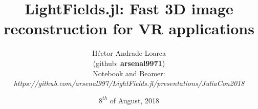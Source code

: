 \title[LightFields.jl: Fast 3D image reconstruction for VR applications]{LightFields.jl: Fast 3D image reconstruction for VR applications}
\author{H\'ector Andrade Loarca\\ (github: \textbf{arsenal9971})\\Notebook and Beamer:\\\textit{https://github.com/arsenal997/LightFields.jl/presentations/JuliaCon2018}}
\date{$8^{th}$ of August, 2018}

\newcommand{\mylogo}{\texttt{[image: images/bms-logo-button.png]}}

\begin{frame}[plain]
	\titlepage
\end{frame}


